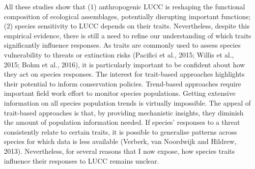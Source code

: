 All these studies show that (1) anthropogenic LUCC is reshaping the functional composition of ecological assemblages, potentially disrupting important functions; (2) species sensitivity to LUCC depends on their traits. Nevertheless, despite this empirical evidence, there is still a need to refine our understanding of which traits significantly influence responses. As traits are commonly used to assess species vulnerability to threats or extinction risks (Pacifici et al., 2015; Willis et al., 2015; Bohm et al., 2016), it is particularly important to be confident about how they act on species responses. The interest for trait-based approaches highlights their potential to inform conservation policies. Trend-based approaches require important field work effort to monitor species populations. Getting extensive information on all species population trends is virtually impossible. The appeal of trait-based approaches is that, by providing mechanistic insights, they diminish the amount of population information needed. If species’ responses to a threat consistently relate to certain traits, it is possible to generalise patterns across species for which data is less available (Verberk, van Noordwijk and Hildrew, 2013). Nevertheless, for several reasons that I now expose, how species traits influence their responses to LUCC remains unclear.
